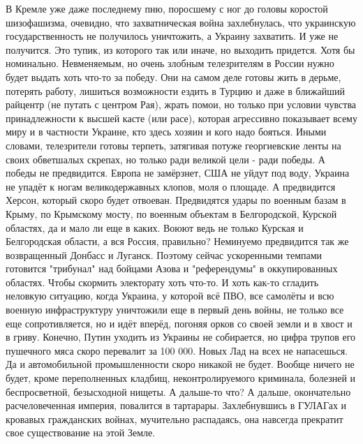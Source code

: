 В Кремле уже даже последнему пню, поросшему с ног до головы коростой шизофашизма, очевидно, что захватническая война захлебнулась, что украинскую государственность не получилось уничтожить, а Украину захватить. И уже не получится. Это тупик, из которого так или иначе, но выходить придется. Хотя бы номинально.
Невменяемым, но очень злобным телезрителям в России нужно будет выдать хоть что-то за победу. Они на самом деле готовы жить в дерьме, потерять работу, лишиться возможности ездить в Турцию и даже в ближайший райцентр (не путать с центром Рая), жрать помои, но только при условии чувства принадлежности к высшей касте (или расе), которая агрессивно показывает всему миру и в частности Украине, кто здесь хозяин и кого надо бояться. Иными словами, телезрители готовы терпеть, затягивая потуже георгиевские ленты на своих обветшалых скрепах, но только ради великой цели - ради победы.
А победы не предвидится. Европа не замёрзнет, США не уйдут под воду, Украина не упадёт к ногам великодержавных клопов, моля о площаде.
А предвидится Херсон, который скоро будет отвоеван. Предвидятся удары по военным базам в Крыму, по Крымскому мосту, по военным объектам в Белгородской, Курской областях, да и мало ли еще в каких. Воюют ведь не только Курская и Белгородская области, а вся Россия, правильно? Неминуемо предвидится так же возвращенный Донбасс и Луганск.
Поэтому сейчас ускоренными темпами готовится "трибунал" над бойцами Азова и "референдумы" в оккупированных областях.
Чтобы скормить электорату хоть что-то. И хоть как-то сгладить неловкую ситуацию, когда Украина, у которой всё ПВО, все самолёты и всю военную инфраструктуру уничтожили еще в первый день войны, не только все еще сопротивляется, но и идёт вперёд, погоняя орков со своей земли и в хвост и в гриву.
Конечно, Путин уходить из Украины не собирается, но цифра трупов его пушечного мяса скоро перевалит за 100 000. Новых Лад на всех не напасешься. Да и автомобильной промышленности скоро никакой не будет.
Вообще ничего не будет, кроме переполненных кладбищ, неконтролируемого криминала, болезней и беспросветной, безысходной нищеты.
А дальше-то что?
А дальше, окончательно расчеловеченная империя, повалится в тартарары. Захлебнувшись в ГУЛАГах и кровавых гражданских войнах, мучительно распадаясь, она навсегда прекратит свое существование на этой Земле.


